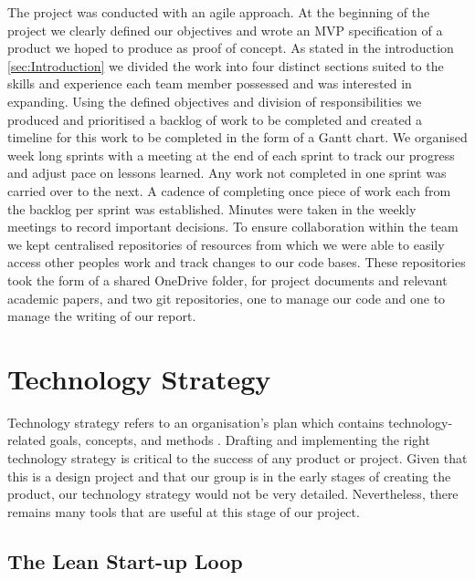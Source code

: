 The project was conducted with an agile approach. 
At the beginning of the project we clearly defined our objectives and wrote an MVP specification of a product we hoped to produce as proof of concept.
As stated in the introduction \ref{sec:Introduction} we divided the work into four distinct sections suited to the skills and experience each team member possessed and was interested in expanding.
Using the defined objectives and division of responsibilities we produced and prioritised a backlog of work to be completed and created a timeline for this work to be completed in the form of a Gantt chart.
We organised week long sprints with a meeting at the end of each sprint to track our progress and adjust pace on lessons learned. 
Any work not completed in one sprint was carried over to the next.
A cadence of completing once piece of work each from the backlog per sprint was established.
Minutes were taken in the weekly meetings to record important decisions.
To ensure collaboration within the team we kept centralised repositories of resources from which we were able to easily access other peoples work and track changes to our code bases.
These repositories took the form of a shared OneDrive folder, for project documents and relevant academic papers, and two git repositories, one to manage our code and one to manage the writing of our report.


\section{Technology Strategy}

Technology strategy refers to an organisation's plan which contains technology-related goals, concepts, and methods \cite{techstratdefinition}. Drafting and implementing the right technology strategy is critical to the success of any product or project. Given that this is a design project and that our group is in the early stages of creating the product, our technology strategy would not be very detailed. Nevertheless, there remains many tools that are useful at this stage of our project.

\subsection{The Lean Start-up Loop}

